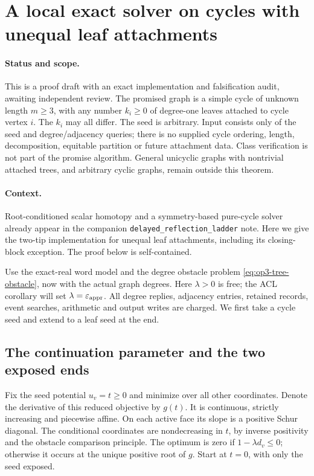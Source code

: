 \section{A local exact solver on cycles with unequal leaf attachments}
\label{sec:op3-local-cycle}

\paragraph{Status and scope.}
This is a \statusproved{} proof draft with an exact implementation and
falsification audit, awaiting independent review. The promised graph is a
simple cycle of unknown length $m\geq3$, with any number $k_i\geq0$ of
degree-one leaves attached to cycle vertex $i$. The $k_i$ may all differ.
The seed is arbitrary. Input consists only of the seed and degree/adjacency
queries; there is no supplied cycle ordering, length, decomposition,
equitable partition or future attachment data. Class verification is not
part of the promise algorithm. General unicyclic graphs with nontrivial
attached trees, and arbitrary cyclic graphs, remain outside this theorem.

\paragraph{Context.}
Root-conditioned scalar homotopy and a symmetry-based pure-cycle solver
already appear in the companion \texttt{delayed\_reflection\_ladder} note.
Here we give the two-tip implementation for unequal leaf attachments,
including its closing-block exception. The proof below is self-contained.

Use the exact-real word model and the degree obstacle problem
\eqref{eq:op3-tree-obstacle}, now with the actual graph degrees. Here
$\lambda>0$ is free; the ACL corollary will set $\lambda=\varepsilon_{\mathrm{appr}}$.
All degree replies, adjacency entries, retained records, event searches,
arithmetic and output writes are charged. We first take a cycle seed and
extend to a leaf seed at the end.

\subsection{The continuation parameter and the two exposed ends}

Fix the seed potential $u_v=t\geq0$ and minimize over all other
coordinates. Denote the derivative of this reduced objective by $g(t)$.
It is continuous, strictly increasing and piecewise affine. On each
active face its slope is a positive Schur diagonal. The conditional
coordinates are nondecreasing in $t$, by inverse positivity and the
obstacle comparison principle. The optimum is zero if
$1-\lambda d_v\leq0$; otherwise it occurs at the unique positive root of
$g$. Start at $t=0$, with only the seed exposed.

